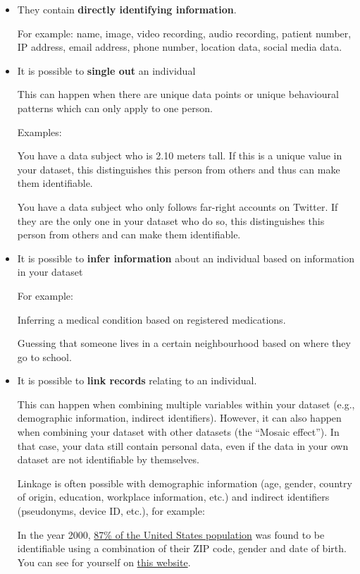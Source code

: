 \documentclass[
]{book}
\begin{document}
\begin{itemize}
\item
  They contain \textbf{directly identifying information}.

  For example: name, image, video recording, audio recording, patient
  number, IP address, email address, phone number, location data, social media
  data.
\item
  It is possible to \textbf{single out} an individual

  This can happen when there are unique data points or unique behavioural
  patterns which can only apply to one person.

  Examples:

  You have a data subject who is 2.10 meters tall. If this is a unique
  value in your dataset, this distinguishes this person from others and thus
  can make them identifiable.

  You have a data subject who only follows far-right accounts on Twitter.
  If they are the only one in your dataset who do so, this distinguishes this
  person from others and can make them identifiable.
\item
  It is possible to \textbf{infer information} about an individual
  based on information in your dataset

  For example:

  Inferring a medical condition based on registered medications.

  Guessing that someone lives in a certain neighbourhood based on where they go to school.
\item
  It is possible to \textbf{link records} relating to an individual.

  This can happen when combining multiple variables within your dataset (e.g., demographic
  information, indirect identifiers). However, it can also happen when combining
  your dataset with other datasets (the ``Mosaic effect''). In that case, your data
  still contain personal data, even if the data in your own dataset are not
  identifiable by themselves.

  Linkage is often possible with demographic information (age,
  gender, country of origin, education, workplace information, etc.) and
  indirect identifiers (pseudonyms, device ID, etc.), for example:

  In the year 2000,
  \href{https://dataprivacylab.org/projects/identifiability/paper1.pdf}{87\% of the United States population}
  was found to be identifiable using a combination of their ZIP code, gender
  and date of birth. You can see for yourself on
  \href{https://cpg.doc.ic.ac.uk/individual-risk/}{this website}.


\end{itemize}
\end{document}
